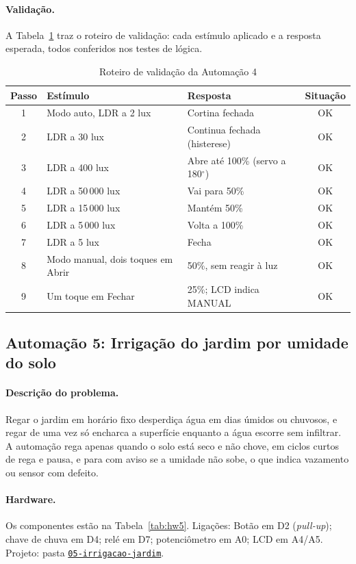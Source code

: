 \documentclass[12pt]{article}
\newcommand{\repositorio}{https://github.com/M-Beserra/Trabalho-sistemas-embarcadosA2}
\newcommand{\pasta}[1]{\href{\repositorio/tree/main/#1}{\texttt{#1}}}
\begin{document}
\paragraph{Validação.} A Tabela~\ref{tab:val4} traz o roteiro de validação: cada estímulo aplicado e a resposta esperada, todos conferidos nos testes de lógica.

\begin{table}[ht]
\centering
\caption{Roteiro de validação da Automação 4}\label{tab:val4}
\footnotesize
\begin{tabularx}{\textwidth}{cXXc}
\toprule
Passo & Estímulo & Resposta & Situação \\
\midrule
1 & Modo auto, LDR a 2 lux & Cortina fechada & OK \\
2 & LDR a 30 lux & Continua fechada (histerese) & OK \\
3 & LDR a 400 lux & Abre até 100\% (servo a 180$^\circ$) & OK \\
4 & LDR a 50\,000 lux & Vai para 50\% & OK \\
5 & LDR a 15\,000 lux & Mantém 50\% & OK \\
6 & LDR a 5\,000 lux & Volta a 100\% & OK \\
7 & LDR a 5 lux & Fecha & OK \\
8 & Modo manual, dois toques em Abrir & 50\%, sem reagir à luz & OK \\
9 & Um toque em Fechar & 25\%; LCD indica MANUAL & OK \\
\bottomrule
\end{tabularx}
\end{table}

\subsection{Automação 5: Irrigação do jardim por umidade do solo}\label{sub:a5}

\paragraph{Descrição do problema.} Regar o jardim em horário fixo desperdiça água em dias úmidos ou chuvosos, e regar de uma vez só encharca a superfície enquanto a água escorre sem infiltrar. A automação rega apenas quando o solo está seco e não chove, em ciclos curtos de rega e pausa, e para com aviso se a umidade não sobe, o que indica vazamento ou sensor com defeito.

\paragraph{Hardware.} Os componentes estão na Tabela~\ref{tab:hw5}. Ligações: Botão em D2 (\emph{pull-up}); chave de chuva em D4; relé em D7; potenciômetro em A0; LCD em A4/A5. Projeto: pasta \pasta{05-irrigacao-jardim}.
\end{document}
